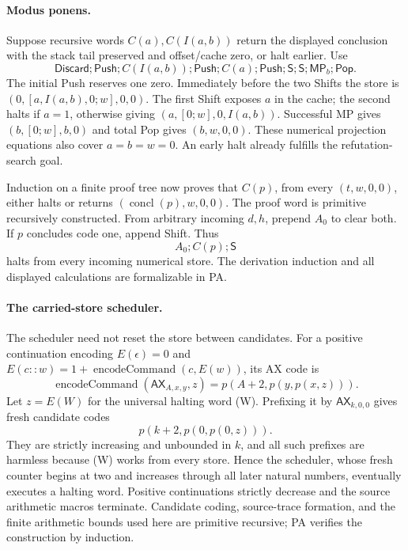 \paragraph{Modus ponens.}
Suppose recursive words $C(a),C(I(a,b))$ return the displayed conclusion
with the stack tail preserved and offset/cache zero, or halt earlier.
Use
\[
 \mathsf{Discard};\mathsf{Push};C(I(a,b));\mathsf{Push};C(a);
 \mathsf{Push};\mathsf S;\mathsf S;\mathsf{MP}_b;\mathsf{Pop}.       \tag{C-MP}
\]
The initial Push reserves one zero.  Immediately before the two Shifts the
store is $(0,[a,I(a,b),0;w],0,0)$.  The first Shift exposes $a$ in the
cache; the second halts if $a=1$, otherwise giving
$(a,[0;w],0,I(a,b))$.  Successful MP gives $(b,[0;w],b,0)$ and total Pop
gives $(b,w,0,0)$.  These numerical projection equations also cover
$a=b=w=0$.  An early halt already fulfills the refutation-search goal.

Induction on a finite proof tree now proves that $C(p)$, from every
$(t,w,0,0)$, either halts or returns
$(\operatorname{concl}(p),w,0,0)$.  The proof word is primitive recursively
constructed.  From arbitrary incoming $d,h$, prepend $A_0$ to clear both.
If $p$ concludes code one, append Shift.  Thus
\[
                         A_0;C(p);\mathsf S                         \tag{W}
\]
halts from every incoming numerical store.  The derivation induction and
all displayed calculations are formalizable in PA.

\paragraph{The carried-store scheduler.}
The scheduler need not reset the store between candidates.  For a positive
continuation encoding $E(\epsilon)=0$ and
$E(c::w)=1+\operatorname{encodeCommand}(c,E(w))$, its AX code is
\[
 \operatorname{encodeCommand}(\mathsf{AX}_{A,x,y},z)
                  =p(A+2,p(y,p(x,z))).
\]
Let $z=E(W)$ for the universal halting word (W).  Prefixing it by
$\mathsf{AX}_{k,0,0}$ gives fresh candidate codes
\[
                       p(k+2,p(0,p(0,z))).
\]
They are strictly increasing and unbounded in $k$, and all such prefixes
are harmless because (W) works from every store.  Hence the scheduler,
whose fresh counter begins at two and increases through all later natural
numbers, eventually executes a halting word.  Positive continuations
strictly decrease and the source arithmetic macros terminate.  Candidate
coding, source-trace formation, and the finite arithmetic bounds used here
are primitive recursive; PA verifies the construction by induction.

